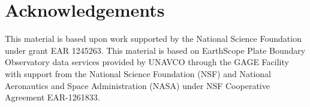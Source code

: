\documentclass[10pt,letter]{article}
\begin{document}
\section{Acknowledgements}
This material is based upon work supported by the National Science Foundation under grant EAR 1245263. This material is based on EarthScope Plate Boundary Observatory data services provided by UNAVCO through the GAGE Facility with support from the National Science Foundation (NSF) and National Aeronautics and Space Administration (NASA) under NSF Cooperative Agreement EAR-1261833. 







  
 
\end{document}
